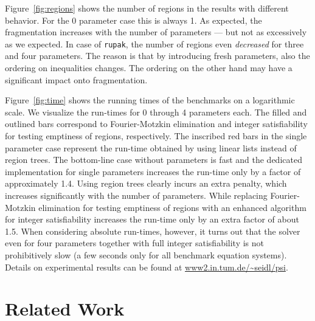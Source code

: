 \documentclass[a4paper]{easychair}
\begin{document}
\noindent
Figure~\ref{fig:regions} shows the number of regions in the results with different behavior. 
For the 0 parameter case this is always 1.
As expected, the fragmentation increases with the number of parameters --- but not as excessively
as we expected. In case of \texttt{rupak}, the number of regions even \emph{decreased} for three and four parameters.
The reason is that by introducing fresh parameters, also the ordering on inequalities changes.
The ordering on the other hand may have a significant impact onto fragmentation.




\begin{figure*}[hbt] \centering
{}
\caption{Execution time in (s).}
\label{fig:time}
\end{figure*}


Figure~\ref{fig:time} shows the running times of the benchmarks on a logarithmic scale. 
We visualize the run-times for 0 through 4 parameters each. The filled and outlined bars correspond to
Fourier-Motzkin elimination and integer satisfiability for testing emptiness of regions, respectively.
The inscribed red bars in the single parameter case represent the run-time 
obtained by using linear lists instead of region trees.
The bottom-line case without parameters is fast and the 
dedicated implementation for single parameters increases the run-time only by a 
factor of approximately 1.4. 
Using region trees clearly incurs an extra penalty, which increases significantly
with the number of parameters. 
While replacing Fourier-Motzkin elimination for testing emptiness of regions 
with an enhanced algorithm for integer satisfiability increases the run-time 
only by an extra factor of about 1.5.
When considering absolute run-times, however, it turns out that the solver even for four parameters 
together with full integer satisfiability
is not prohibitively slow (a few seconds only for all benchmark equation systems).
Details on experimental results can be found at \url{www2.in.tum.de/~seidl/psi}.











\section{Related Work}\label{s:related}
\end{document}
